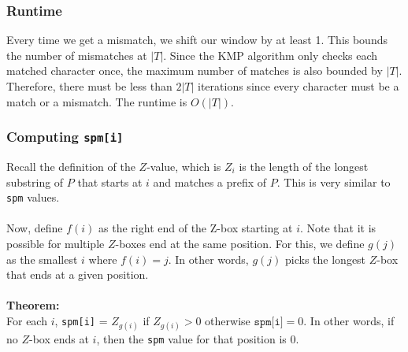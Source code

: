 \documentclass[10pt]{article}
\begin{document}
\subsubsection*{Runtime}
Every time we get a mismatch, we shift our window by at least 1.  This bounds the number of mismatches at $|T|$.  Since the KMP algorithm only checks each matched character once, the maximum number of matches is also bounded by $|T|$.  Therefore, there must be less than $2|T|$ iterations since every character must be a match or a mismatch.  The runtime is $O(|T|)$.  

\subsubsection*{Computing \texttt{spm[i]}}
Recall the definition of the $Z$-value, which is $Z_i$ is the length of the longest substring of $P$ that starts at $i$ and matches a prefix of $P$.  This is very similar to \texttt{spm} values.\\\\
Now, define $f(i)$ as the right end of the Z-box starting at $i$.  Note that it is possible for multiple $Z$-boxes end at the same position.  For this, we define $g(j)$ as the smallest $i$ where $f(i) = j$.  In other words, $g(j)$ picks the longest $Z$-box that ends at a given position.\\\\
\textbf{Theorem:}\\
For each $i$, \texttt{spm[i]} = $Z_{g(i)}$ if $Z_{g(i)} > 0$ otherwise $\texttt{spm[i]} = 0$.  In other words, if no $Z$-box ends at $i$, then the \texttt{spm} value for that position is $0$.
\end{document}
